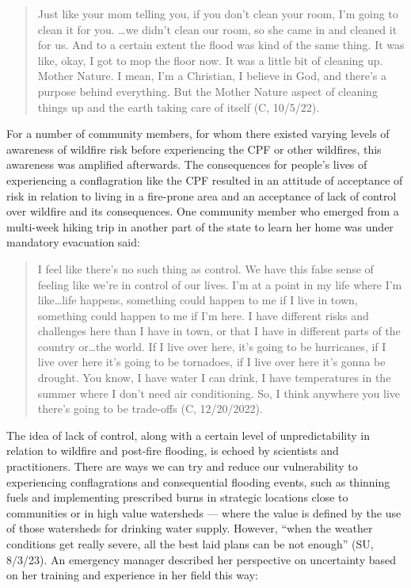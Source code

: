 \documentclass[
]{article}
\begin{document}
\begin{quote}
Just like your mom telling you, if you don't clean your room, I'm going to clean it for you. \ldots we didn't clean our room, so she came in and cleaned it for us. And to a certain extent the flood was kind of the same thing. It was like, okay, I got to mop the floor now. It was a little bit of cleaning up. Mother Nature. I mean, I'm a Christian, I believe in God, and there's a purpose behind everything. But the Mother Nature aspect of cleaning things up and the earth taking care of itself (C, 10/5/22).
\end{quote}

For a number of community members, for whom there existed varying levels of awareness of wildfire risk before experiencing the CPF or other wildfires, this awareness was amplified afterwards. The consequences for people's lives of experiencing a conflagration like the CPF resulted in an attitude of acceptance of risk in relation to living in a fire-prone area and an acceptance of lack of control over wildfire and its consequences. One community member who emerged from a multi-week hiking trip in another part of the state to learn her home was under mandatory evacuation said:

\begin{quote}
I feel like there's no such thing as control. We have this false sense of feeling like we're in control of our lives. I'm at a point in my life where I'm like\ldots life happens, something could happen to me if I live in town, something could happen to me if I'm here. I have different risks and challenges here than I have in town, or that I have in different parts of the country or\ldots the world. If I live over here, it's going to be hurricanes, if I live over here it's going to be tornadoes, if I live over here it's gonna be drought. You know, I have water I can drink, I have temperatures in the summer where I don't need air conditioning. So, I think anywhere you live there's going to be trade-offs (C, 12/20/2022).
\end{quote}

The idea of lack of control, along with a certain level of unpredictability in relation to wildfire and post-fire flooding, is echoed by scientists and practitioners. There are ways we can try and reduce our vulnerability to experiencing conflagrations and consequential flooding events, such as thinning fuels and implementing prescribed burns in strategic locations close to communities or in high value watersheds --- where the value is defined by the use of those watersheds for drinking water supply. However, ``when the weather conditions get really severe, all the best laid plans can be not enough'' (SU, 8/3/23). An emergency manager described her perspective on uncertainty based on her training and experience in her field this way:
\end{document}

